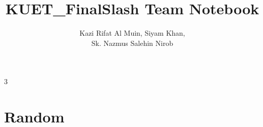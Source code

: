 \documentclass[8pt, a4paper, onesided]{article}
\title{\vspace{-2.5ex}KUET\_FinalSlash Team Notebook}
\author{Kazi Rifat Al Muin, Siyam Khan,\\Sk. Nazmus Salehin Nirob}
\date{}
\begin{document}
\begin{landscape}
\begin{multicols*}{3}

\maketitle
\vspace{-7ex}
\tableofcontents
\pagestyle{fancy}
 
\raggedbottom


\section{Random}
    
\end{multicols*}


\end{landscape}
\end{document}
